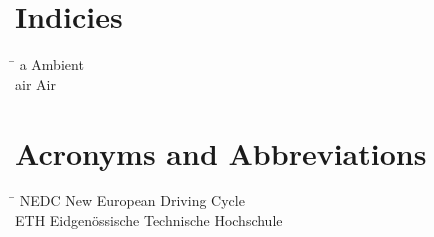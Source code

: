 \section*{Indicies}
\begin{tabbing}
 \hspace*{1.6cm}  \= \kill
 a \> Ambient \\[0.5ex]
 air \> Air
\end{tabbing}

\section*{Acronyms and Abbreviations}
\begin{tabbing}
 \hspace*{1.6cm}  \= \kill
 NEDC \> New European Driving Cycle \\[0.5ex]
 ETH \> Eidgen\"{o}ssische Technische Hochschule
\end{tabbing}

 \cleardoublepage

